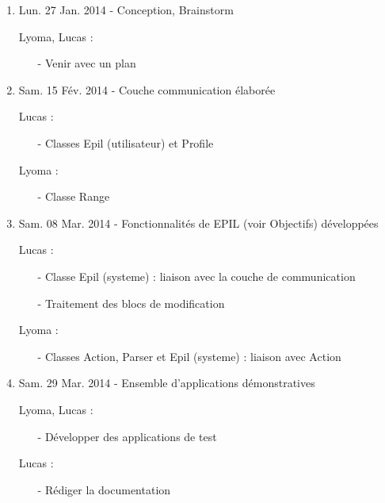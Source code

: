 \documentclass[12pt,a4paper]{article}
\begin{document}
\begin{enumerate}

\item Lun. 27 Jan. 2014 - Conception, Brainstorm

  \-Lyoma, Lucas :
  \begin{itemize}
  \item[-] Venir avec un plan
  \end{itemize}

\item Sam. 15 F\'{e}v. 2014 - Couche communication \'{e}labor\'{e}e

  \-Lucas :
  \begin{itemize}
  \item[-] Classes Epil (utilisateur) et Profile
  \end{itemize}

  \-Lyoma :
  \begin{itemize}
  \item[-] Classe Range
  \end{itemize}

\item Sam. 08 Mar. 2014 - Fonctionnalit\'{e}s de EPIL (voir Objectifs) d\'{e}velopp\'{e}es

  \-Lucas :
  \begin{itemize}
  \item[-] Classe Epil (systeme) : liaison avec la couche de communication
  \item[-] Traitement des blocs de modification
  \end{itemize}

  \-Lyoma :
  \begin{itemize}
  \item[-] Classes Action, Parser et Epil (systeme) : liaison avec Action
  \end{itemize}

\item Sam. 29 Mar. 2014 - Ensemble d'applications d\'{e}monstratives

  \-Lyoma, Lucas :
  \begin{itemize}
  \item[-] D\'{e}velopper des applications de test
  \end{itemize}
  
  \-Lucas :
  \begin{itemize}
  \item[-] R\'{e}diger la documentation
  \end{itemize}
\end{enumerate}
\end{document}
